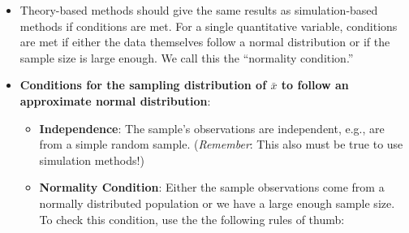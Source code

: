 \documentclass[
]{report}
\begin{document}
\begin{itemize}
\item
  Theory-based methods should give the same results as simulation-based methods if conditions are met. For a single quantitative variable, conditions are met if either the data themselves follow a normal distribution or if the sample size is large enough. We call this the ``normality condition.''
\item
  \textbf{Conditions for the sampling distribution of \(\bar{x}\) to follow an approximate normal distribution}:

  \begin{itemize}
  \item
    \textbf{Independence}: The sample's observations are independent, e.g., are from a simple random sample. (\emph{Remember}: This also must be true to use simulation methods!)
  \item
    \textbf{Normality Condition}: Either the sample observations come from a normally distributed population or we have a large enough sample size. To check this condition, use the the following rules of thumb:


\end{itemize}
\end{itemize}
\end{document}
